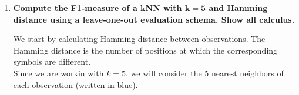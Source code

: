 \documentclass[12pt]{article}
\begin{document}
\vspace{10pt}
\begin{enumerate}[leftmargin=\labelsep]
    \item \textbf{Compute the F1-measure of a $\mathbf{k}$NN with $\mathbf{k =  5}$ and Hamming distance using a
    leave-one-out evaluation schema. Show all calculus.}

    \vspace{10pt}
    We start by calculating Hamming distance between observations. The Hamming distance is the number of positions at which the corresponding symbols are different.\\
    Since we are workin with $k = 5$, we will consider the 5 nearest neighbors of each observation (written in blue).
    \vspace{10pt}
    

\end{enumerate}
\end{document}
